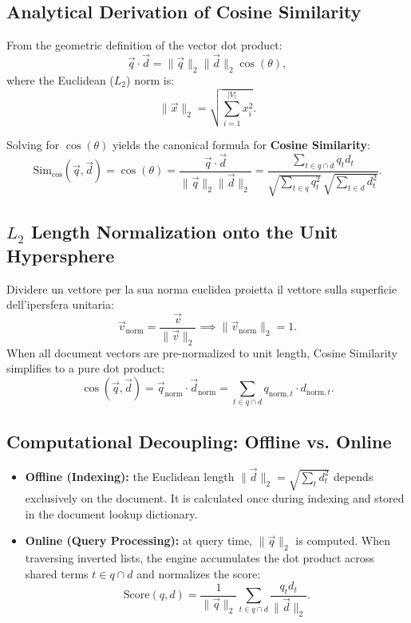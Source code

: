 \subsection{Analytical Derivation of Cosine Similarity}
From the geometric definition of the vector dot product:
\begin{equation}
\vec{q} \cdot \vec{d} = \|\vec{q}\|_2 \|\vec{d}\|_2 \cos(\theta),
\end{equation}
where the Euclidean ($L_2$) norm is:
\begin{equation}
\|\vec{x}\|_2 = \sqrt{\sum_{i=1}^{|V|} x_i^2}.
\end{equation}

Solving for $\cos(\theta)$ yields the canonical formula for \textbf{Cosine Similarity}:
\begin{equation}
\text{Sim}_{\cos}(\vec{q}, \vec{d}) = \cos(\theta) = \frac{\vec{q} \cdot \vec{d}}{\|\vec{q}\|_2 \|\vec{d}\|_2} = \frac{\sum_{t \in q \cap d} q_t d_t}{\sqrt{\sum_{t \in q} q_t^2} \, \sqrt{\sum_{t \in d} d_t^2}}.
\end{equation}

\subsection[L2 Length Normalization onto the Unit Hypersphere]{$L_2$ Length Normalization onto the Unit Hypersphere}
Dividere un vettore per la sua norma euclidea proietta il vettore sulla superficie dell'ipersfera unitaria:
\begin{equation}
\vec{v}_{\text{norm}} = \frac{\vec{v}}{\|\vec{v}\|_2} \implies \|\vec{v}_{\text{norm}}\|_2 = 1.
\end{equation}
When all document vectors are pre-normalized to unit length, Cosine Similarity simplifies to a pure dot product:
\begin{equation}
\cos(\vec{q}, \vec{d}) = \vec{q}_{\text{norm}} \cdot \vec{d}_{\text{norm}} = \sum_{t \in q \cap d} q_{\text{norm}, t} \cdot d_{\text{norm}, t}.
\end{equation}

\subsection{Computational Decoupling: Offline vs. Online}
\begin{itemize}
    \item \textbf{Offline (Indexing):} the Euclidean length $\|\vec{d}\|_2 = \sqrt{\sum_t d_t^2}$ depends exclusively on the document. It is calculated once during indexing and stored in the document lookup dictionary.
    \item \textbf{Online (Query Processing):} at query time, $\|\vec{q}\|_2$ is computed. When traversing inverted lists, the engine accumulates the dot product across shared terms $t \in q \cap d$ and normalizes the score:
    \begin{equation}
    \text{Score}(q, d) = \frac{1}{\|\vec{q}\|_2} \sum_{t \in q \cap d} \frac{q_t d_t}{\|\vec{d}\|_2}.
    \end{equation}
\end{itemize}

